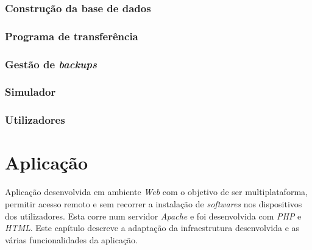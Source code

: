 \documentclass[11pt,twoside,a4paper]{report}
\begin{document}
\subsection{Construção da base de dados}

\subsection{Programa de transferência}

\subsection{Gestão de \textit{backups}}
\label{subchap:backups}

\subsection{Simulador}

\subsection{Utilizadores}

\cleardoublepage
\chapter{Aplicação}
Aplicação desenvolvida em ambiente  \textit{Web} com o objetivo de ser multiplataforma, permitir acesso remoto e sem recorrer a instalação de \textit{softwares} nos dispositivos dos utilizadores. Esta corre num servidor \textit{Apache} e foi desenvolvida com \textit{PHP} e \textit{HTML}. Este capítulo descreve a adaptação da infraestrutura desenvolvida e as várias funcionalidades da aplicação.
\end{document}
